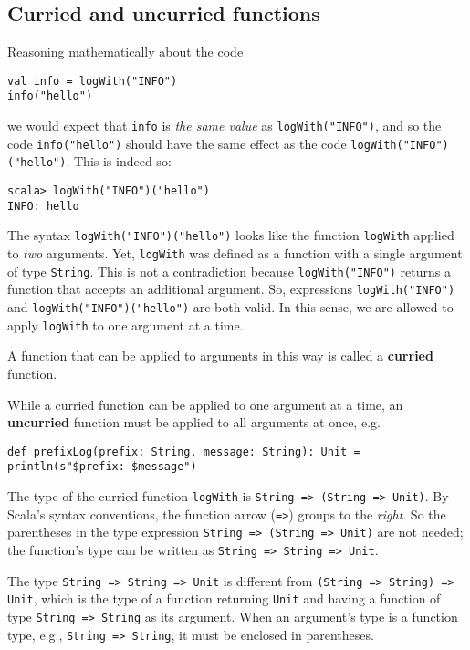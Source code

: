 \subsection{Curried and uncurried functions}

Reasoning mathematically about the code
\begin{lstlisting}
val info = logWith("INFO")
info("hello")
\end{lstlisting}
we would expect that \lstinline!info! is \emph{the same value} as
\lstinline!logWith("INFO")!, and so the code \lstinline!info("hello")!
should have the same effect as the code \lstinline!logWith("INFO")("hello")!.
This is indeed so:
\begin{lstlisting}
scala> logWith("INFO")("hello")
INFO: hello
\end{lstlisting}
The syntax \lstinline!logWith("INFO")("hello")! looks like the function
\lstinline!logWith! applied to \emph{two} arguments. Yet, \lstinline!logWith!
was defined as a function with a single argument of type \lstinline!String!.
This is not a contradiction because \lstinline!logWith("INFO")! returns
a function that accepts an additional argument. So, expressions \lstinline!logWith("INFO")!
and \lstinline!logWith("INFO")("hello")! are both valid. In this
sense, we are allowed to apply \lstinline!logWith! to one argument
at a time.

A function that can be applied to arguments in this way is called
a \textbf{curried} function. 

While a curried function can be applied to one argument at a time,
an \textbf{uncurried} function must be
applied to all arguments at once, e.g.
\begin{lstlisting}
def prefixLog(prefix: String, message: String): Unit = println(s"$prefix: $message")
\end{lstlisting}

The type of the curried function \lstinline!logWith! is \lstinline!String => (String => Unit)!.
By Scala\textsf{'}s syntax conventions, the function arrow (\lstinline!=>!)
groups to the \emph{right}. So the parentheses in the type expression
\lstinline!String => (String => Unit)! are not needed; the function\textsf{'}s
type can be written as \lstinline!String => String => Unit!.

The type \lstinline!String => String => Unit! is different from \lstinline!(String => String) => Unit!,
which is the type of a function returning \lstinline!Unit! and having
a function of type \lstinline!String => String! as its argument.
When an argument\textsf{'}s type is a function type, e.g., \lstinline!String => String!,
it must be enclosed in parentheses.

